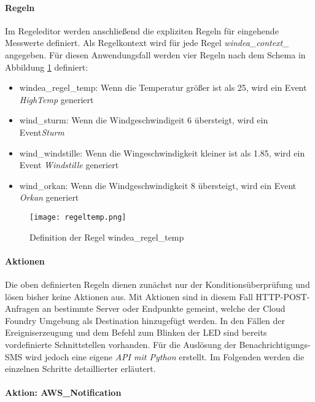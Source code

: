 \paragraph{Regeln} Im Regeleditor werden anschließend die expliziten Regeln für eingehende Messwerte definiert. Als Regelkontext wird für jede Regel \textit{windea\_context\_} angegeben. Für diesen Anwendungsfall werden vier Regeln nach dem Schema in Abbildung \ref{rules} definiert:
\begin{itemize}
  \item windea\_regel\_temp: Wenn die Temperatur größer ist als 25, wird ein Event \textit{HighTemp} generiert
  \item wind\_sturm: Wenn die Windgeschwindigeit 6 übersteigt, wird ein Event\textit{Sturm}
  \item wind\_windstille: Wenn die Wingeschwindigkeit kleiner ist als 1.85, wird ein Event \textit{Windstille} generiert
  \item wind\_orkan: Wenn die Windgeschwindigkeit 8 übersteigt, wird ein Event \textit{Orkan} generiert
\end{itemize}

\begin{figure} [H]
  \centering
  \texttt{[image: regeltemp.png]}
  \caption[Definition einer Regel]{Definition der Regel windea\_regel\_temp}
  \label{rules}
\end{figure}

\paragraph{Aktionen}

Die oben definierten Regeln dienen zunächst nur der Konditionsüberprüfung und lösen bisher keine Aktionen aus. Mit Aktionen sind in diesem Fall HTTP-POST-Anfragen an bestimmte Server oder Endpunkte gemeint, welche der Cloud Foundry Umgebung als Destination hinzugefügt werden. In den Fällen der Ereigniserzeugung und dem Befehl zum Blinken der LED sind bereits vordefinierte Schnittstellen vorhanden. Für die Auslösung der Benachrichtigungs-SMS wird jedoch eine eigene \textit{API mit Python} erstellt. Im Folgenden werden die einzelnen Schritte detaillierter erläutert.

\paragraph{Aktion: AWS\_Notification}

